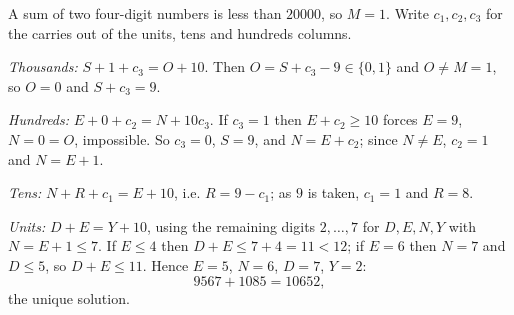 A sum of two four-digit numbers is less than $20000$, so $M=1$. Write $c_1,c_2,c_3$ for the carries out of the units, tens and hundreds columns.

\emph{Thousands:} $S+1+c_3=O+10$. Then $O=S+c_3-9\in\{0,1\}$ and $O\ne M=1$, so $O=0$ and $S+c_3=9$.

\emph{Hundreds:} $E+0+c_2=N+10c_3$. If $c_3=1$ then $E+c_2\ge10$ forces $E=9$, $N=0=O$, impossible. So $c_3=0$, $S=9$, and $N=E+c_2$; since $N\ne E$, $c_2=1$ and $N=E+1$.

\emph{Tens:} $N+R+c_1=E+10$, i.e. $R=9-c_1$; as $9$ is taken, $c_1=1$ and $R=8$.

\emph{Units:} $D+E=Y+10$, using the remaining digits $2,\dots,7$ for $D,E,N,Y$ with $N=E+1\le7$. If $E\le4$ then $D+E\le 7+4=11<12$; if $E=6$ then $N=7$ and $D\le5$, so $D+E\le11$. Hence $E=5$, $N=6$, $D=7$, $Y=2$:
\[\boxed{9567+1085=10652},\]
the unique solution.
